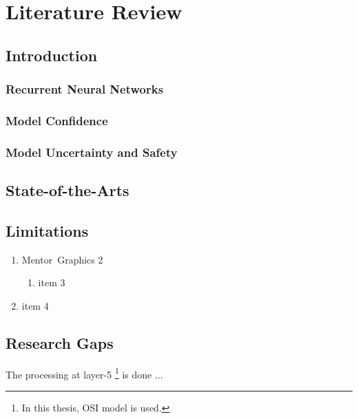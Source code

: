 \chapter{Literature Review}
\label{chap:lit.review}

\section{Introduction}

\subsection{Recurrent Neural Networks}

\subsection{Model Confidence}

\subsection{Model Uncertainty and Safety}

\section{State-of-the-Arts}

\section{Limitations}
\begin{enumerate}
\item Mentor~Graphics 2
\begin{enumerate}
\item item 3
\end{enumerate}
\item item 4
\end{enumerate}

\section{Research Gaps}
The processing at layer-5%
\footnote{In this thesis, OSI model is used.} is done ...
